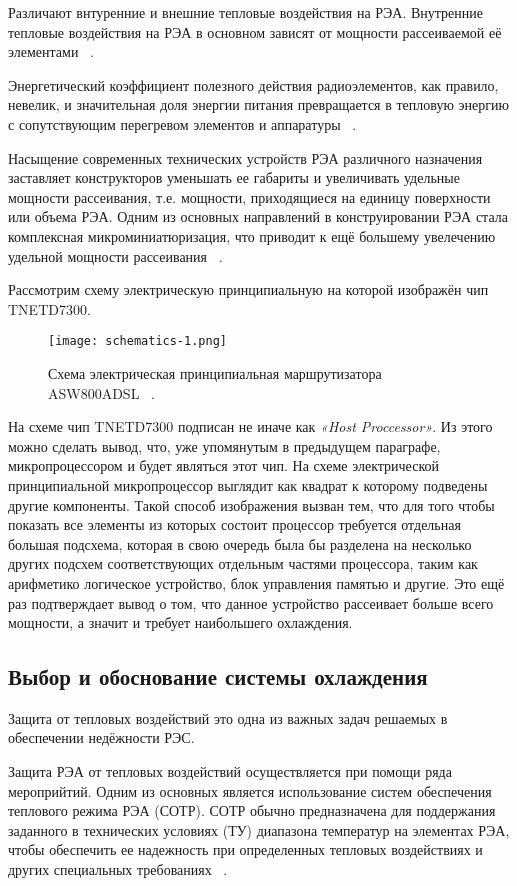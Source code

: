 Различают внтуренние и внешние тепловые воздействия на РЭА.
Внутренние тепловые воздействия на РЭА в основном зависят от мощности
рассеиваемой её элементами ~\cite{Rotkop1976}.

Энергетический коэффициент полезного действия радиоэлементов, как
правило, невелик, и значительная доля энергии питания превращается в
тепловую энергию с сопутствующим перегревом элементов и аппаратуры
~\cite{Rotkop1976}.

Насыщение современных технических устройств РЭА различного назначения
заставляет конструкторов уменьшать ее габариты и увеличивать удельные
мощности рассеивания, т.е. мощности, приходящиеся на единицу
поверхности или объема РЭА. Одним из основных направлений в
конструировании РЭА стала комплексная микроминиатюризация, что
приводит к ещё большему увелечению удельной мощности рассеивания
~\cite{Rotkop1976}.

Рассмотрим схему электрическую принципиальную на которой изображён чип
TNETD7300.

\begin{figure}[hb]
  \centering
  \texttt{[image: schematics-1.png]}
  \caption{Схема электрическая принципиальная
    маршрутизатора ASW800ADSL ~\cite{SCHEMATICS}.}
\end{figure}

На схеме чип TNETD7300 подписан не иначе как \textit{«Host Proccessor»}.
Из этого можно сделать вывод, что, уже упомянутым в предыдущем
параграфе, микропроцессором и будет являться этот чип.  На схеме
электрической принципиальной микропроцессор выглядит как квадрат к
которому подведены другие компоненты. Такой способ изображения вызван
тем, что для того чтобы показать все элементы из которых состоит
процессор требуется отдельная большая подсхема, которая в свою очередь
была бы разделена на несколько других подсхем соответствующих
отдельным частями процессора, таким как арифметико логическое
устройство, блок управления памятью и другие. Это ещё раз подтверждает
вывод о том, что данное устройство рассеивает больше всего мощности, а
значит и требует наибольшего охлаждения.

\subsection{Выбор и обоснование системы охлаждения}

Защита от тепловых воздействий это одна из важных задач решаемых в обеспечении недёжности РЭС.

Защита РЭА от тепловых воздействий осуществляется при помощи ряда
мероприйтий. Одним из основных является использование систем
обеспечения теплового режима РЭА (СОТР). СОТР обычно предназначена для
поддержания заданного в технических условиях (ТУ) диапазона температур
на элементах РЭА, чтобы обеспечить ее надежность при определенных
тепловых воздействиях и других специальных требованиях ~\cite{Rotkop1976}.

